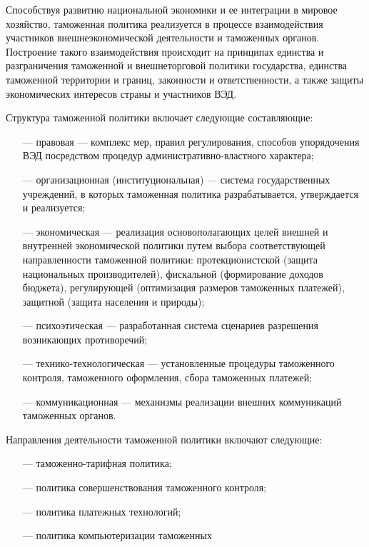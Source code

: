 Способствуя развитию национальной экономики и ее интеграции в мировое хозяйство, таможенная политика реализуется в процессе взаимодействия участников внешнеэкономической деятельности и таможенных органов. Построение такого взаимодействия происходит на принципах единства и разграничения таможенной и внешнеторговой политики государства, единства таможенной территории и границ, законности и ответственности, а также защиты экономических интересов страны и участников ВЭД.

Структура таможенной политики включает следующие составляющие:
\begin{enumerate}
	\item [---] правовая --- комплекс мер, правил регулирования, способов упорядочения ВЭД посредством процедур административно-властного характера;
	\item [---] организационная (институциональная) --- система государственных учреждений, в которых таможенная политика разрабатывается, утверждается и реализуется;
	\item [---] экономическая --- реализация основополагающих целей внешней и внутренней экономической политики путем выбора соответствующей  направленности таможенной политики: протекционистской (защита национальных производителей), фискальной (формирование доходов бюджета), регулирующей (оптимизация размеров таможенных платежей), защитной (защита населения и природы);
	\item [---] психоэтическая --- разработанная система сценариев разрешения возникающих противоречий;
	\item [---] технико-технологическая --- установленные процедуры таможенного контроля, таможенного оформления, сбора таможенных платежей;
	\item [---] коммуникационная --- механизмы реализации внешних коммуникаций таможенных органов.
\end{enumerate}

Направления деятельности таможенной политики включают следующие:
\begin{enumerate}
	\item [---] таможенно-тарифная политика;
	\item [---] политика совершенствования таможенного контроля;
	\item [---] политика платежных технологий;
	\item [---] политика компьютеризации таможенных
\end{enumerate}












